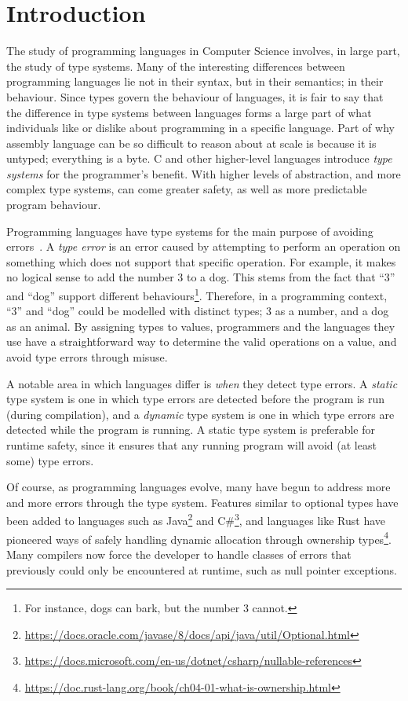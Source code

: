 \chapter{Introduction}

The study of programming languages in Computer Science involves, in large part, the study of type systems. Many of the interesting differences between programming languages lie not in their syntax, but in their semantics; in their behaviour. Since types govern the behaviour of languages, it is fair to say that the difference in type systems between languages forms a large part of what individuals like or dislike about programming in a specific language. Part of why assembly language can be so difficult to reason about at scale is because it is untyped; everything is a byte. C and other higher-level languages introduce \emph{type systems} for the programmer's benefit. With higher levels of abstraction, and more complex type systems, can come greater safety, as well as more predictable program behaviour.

Programming languages have type systems for the main purpose of avoiding errors~\cite{cardellitypes}. A \emph{type error} is an error caused by attempting to perform an operation on something which does not support that specific operation. For example, it makes no logical sense to add the number 3 to a dog. This stems from the fact that ``3'' and ``dog'' support different behaviours\footnote{For instance, dogs can bark, but the number 3 cannot.}. Therefore, in a programming context, ``3'' and ``dog'' could be modelled with distinct types; 3 as a number, and a dog as an animal. By assigning types to values, programmers and the languages they use have a straightforward way to determine the valid operations on a value, and avoid type errors through misuse.

A notable area in which languages differ is \emph{when} they detect type errors. A \emph{static} type system is one in which type errors are detected before the program is run (during compilation), and a \emph{dynamic} type system is one in which type errors are detected while the program is running. A static type system is preferable for runtime safety, since it ensures that any running program will avoid (at least some) type errors.

Of course, as programming languages evolve, many have begun to address more and more errors through the type system. Features similar to optional types have been added to languages such as Java\footnote{\url{https://docs.oracle.com/javase/8/docs/api/java/util/Optional.html}} and C\#\footnote{\url{https://docs.microsoft.com/en-us/dotnet/csharp/nullable-references}}, and languages like Rust have pioneered ways of safely handling dynamic allocation through ownership types\footnote{\url{https://doc.rust-lang.org/book/ch04-01-what-is-ownership.html}}. Many compilers now force the developer to handle classes of errors that previously could only be encountered at runtime, such as null pointer exceptions.

